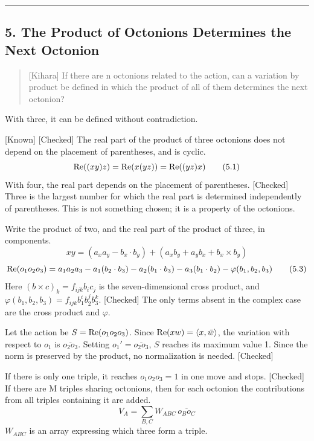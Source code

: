 \documentclass[
  a4paper,
]{article}
\begin{document}
\begin{center}\rule{0.5\linewidth}{0.5pt}\end{center}

\subsection{5. The Product of Octonions Determines the Next
Octonion}\label{the-product-of-octonions-determines-the-next-octonion}

\begin{quote}
{[}Kihara{]} If there are n octonions related to the action, can a
variation by product be defined in which the product of all of them
determines the next octonion?
\end{quote}

With three, it can be defined without contradiction.

{[}Known{]} {[}Checked{]} The real part of the product of three
octonions does not depend on the placement of parentheses, and is
cyclic. \[
{\rm Re}((xy)z) = {\rm Re}(x(yz)) = {\rm Re}((yz)x) \tag{5.1}
\] With four, the real part depends on the placement of parentheses.
{[}Checked{]} Three is the largest number for which the real part is
determined independently of parentheses. This is not something chosen;
it is a property of the octonions.

Write the product of two, and the real part of the product of three, in
components. \[
xy = (a_xa_y - b_x\cdot b_y) + (a_xb_y + a_yb_x + b_x\times b_y) \tag{5.2}
\] \[
{\rm Re}(o_1o_2o_3) = a_1a_2a_3 - a_1(b_2\cdot b_3) - a_2(b_1\cdot b_3) - a_3(b_1\cdot b_2) - \varphi(b_1, b_2, b_3) \tag{5.3}
\] Here \((b\times c)_k = f_{ijk}b_ic_j\) is the seven-dimensional cross
product, and \(\varphi(b_1,b_2,b_3) = f_{ijk}b_1^ib_2^jb_3^k\).
{[}Checked{]} The only terms absent in the complex case are the cross
product and \(\varphi\).

Let the action be \(S = {\rm Re}(o_1o_2o_3)\). Since
\({\rm Re}(xw) = \langle x, \bar w\rangle\), the variation with respect
to \(o_1\) is \(\overline{o_2o_3}\). Setting
\(o_1' = \overline{o_2o_3}\), \(S\) reaches its maximum value 1. Since
the norm is preserved by the product, no normalization is needed.
{[}Checked{]}

If there is only one triple, it reaches \(o_1o_2o_3 = 1\) in one move
and stops. {[}Checked{]} If there are M triples sharing octonions, then
for each octonion the contributions from all triples containing it are
added. \[
V_A = \sum_{B,C} W_{ABC}\,\overline{o_Bo_C} \tag{5.4}
\] \(W_{ABC}\) is an array expressing which three form a triple.
\end{document}
